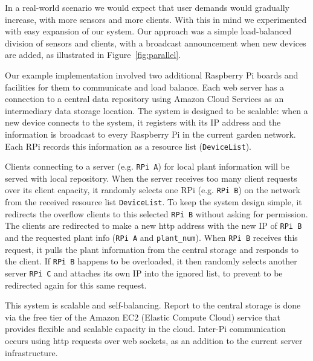 \documentclass[a4paper]{acm_proc_article-sp}
\begin{document}
In a real-world scenario we would expect that user demands would gradually increase, with more sensors and more clients.  With this in mind we experimented with easy expansion of our system.  Our approach was a simple load-balanced division of sensors and clients, with a broadcast announcement when new devices are added, as illustrated in Figure~\ref{fig:parallel}.

Our example implementation involved two additional Raspberry Pi boards and facilities for them to communicate and load balance. Each web server has a connection to a central data repository using Amazon Cloud Services as an intermediary data storage location. The system is designed to be scalable: when a new device connects to the system, it registers with its IP address and the information is broadcast to every Raspberry Pi in the current garden network. Each RPi records this information as a resource list (\lstinline|DeviceList|).

Clients connecting to a server (e.g. \lstinline|RPi A|) for local plant information will be served with local repository. When the server receives too many client requests over its client capacity, it randomly selects one RPi (e.g. \lstinline|RPi B|) on the network from the received resource list \lstinline|DeviceList|. To keep the system design simple, it redirects the overflow clients to this selected \lstinline|RPi B| without asking for permission. The clients are redirected to make a new http address with the new IP of \lstinline|RPi B| and the requested plant info (\lstinline|RPi A| and \lstinline|plant_num|). When \lstinline|RPi B| receives this  request, it pulls the plant information from the central storage and responds to the client. If \lstinline|RPi B| happens to be overloaded, it then randomly selects another server \lstinline|RPi C| and attaches its own IP into the ignored list, to prevent to be redirected again for this same request.

This system is scalable and self-balancing.  Report to the central storage is done via the free tier of the Amazon EC2 (Elastic Compute Cloud) service that provides flexible and scalable capacity in the cloud.  Inter-Pi communication occurs using http requests over web sockets, as an addition to the current server infrastructure.
\end{document}
